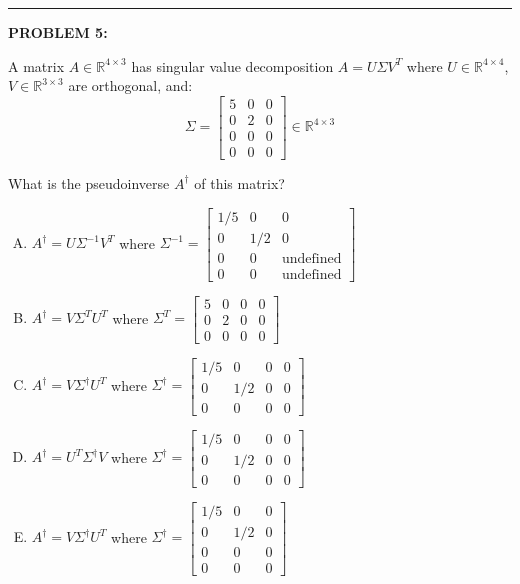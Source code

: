 \documentclass[12pt]{amsart}
\newcommand{\divider}{
  \vspace{-1em} %
  \noindent
  \raisebox{-0.15ex}{\textbullet}%
  \hspace{0.5em}%
  \rule[0.5ex]{0.95\textwidth}{1.0pt}%
  \hspace{0.5em}%
  \raisebox{-0.15ex}{\textbullet}%
  \vspace{0em} %
}
\begin{document}
\divider

{\bf PROBLEM 5:}

A matrix $A \in \mathbb{R}^{4 \times 3}$ has singular value decomposition $A = U\Sigma V^T$ where $U \in \mathbb{R}^{4 \times 4}$, $V \in \mathbb{R}^{3 \times 3}$ are orthogonal, and:
$$\Sigma = \begin{bmatrix} 5 & 0 & 0 \\ 0 & 2 & 0 \\ 0 & 0 & 0 \\ 0 & 0 & 0 \end{bmatrix} \in \mathbb{R}^{4 \times 3}$$

What is the pseudoinverse $A^\dagger$ of this matrix?

\begin{enumerate}[(A)]
\item $A^\dagger = U\Sigma^{-1} V^T$ where $\Sigma^{-1} = \begin{bmatrix} 1/5 & 0 & 0 \\ 0 & 1/2 & 0 \\ 0 & 0 & \text{undefined} \\ 0 & 0 & \text{undefined} \end{bmatrix}$
\item $A^\dagger = V\Sigma^T U^T$ where $\Sigma^T = \begin{bmatrix} 5 & 0 & 0 & 0 \\ 0 & 2 & 0 & 0 \\ 0 & 0 & 0 & 0 \end{bmatrix}$
\item $A^\dagger = V\Sigma^\dagger U^T$ where $\Sigma^\dagger = \begin{bmatrix} 1/5 & 0 & 0 & 0 \\ 0 & 1/2 & 0 & 0 \\ 0 & 0 & 0 & 0 \end{bmatrix}$
\item $A^\dagger = U^T\Sigma^\dagger V$ where $\Sigma^\dagger = \begin{bmatrix} 1/5 & 0 & 0 & 0 \\ 0 & 1/2 & 0 & 0 \\ 0 & 0 & 0 & 0 \end{bmatrix}$
\item $A^\dagger = V\Sigma^\dagger U^T$ where $\Sigma^\dagger = \begin{bmatrix} 1/5 & 0 & 0 \\ 0 & 1/2 & 0 \\ 0 & 0 & 0 \\ 0 & 0 & 0 \end{bmatrix}$
\end{enumerate}
\end{document}
